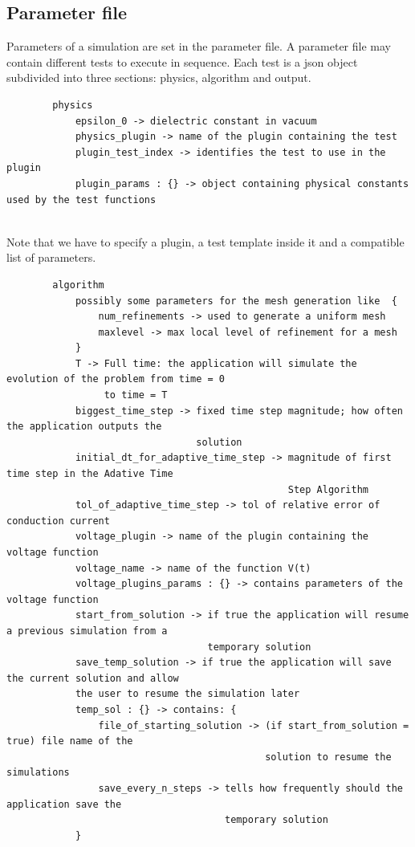 \documentclass[11pt,a4paper]{article}
\begin{document}
\subsection{Parameter file}
Parameters of a simulation are set in the parameter file. A parameter file may contain different tests to execute in sequence. Each test is a json object subdivided into three sections: physics, algorithm and output.\\
\begin{minipage}{\textwidth}
	\vspace{3mm}
	\small
	\begin{verbatim}
		physics
		    epsilon_0 -> dielectric constant in vacuum
		    physics_plugin -> name of the plugin containing the test
		    plugin_test_index -> identifies the test to use in the plugin
		    plugin_params : {} -> object containing physical constants used by the test functions
	\end{verbatim}
	\vspace*{0mm}
\end{minipage}\\
Note that we have to specify a plugin, a test template inside it and a compatible list of parameters.\\
\begin{minipage}{\textwidth}
	\vspace{3mm}
	\small
	\begin{verbatim}
		algorithm
		    possibly some parameters for the mesh generation like  {
		        num_refinements -> used to generate a uniform mesh
			    maxlevel -> max local level of refinement for a mesh
		    }
		    T -> Full time: the application will simulate the evolution of the problem from time = 0
		         to time = T
		    biggest_time_step -> fixed time step magnitude; how often the application outputs the
		                         solution
		    initial_dt_for_adaptive_time_step -> magnitude of first time step in the Adative Time
		                                         Step Algorithm
		    tol_of_adaptive_time_step -> tol of relative error of conduction current
		    voltage_plugin -> name of the plugin containing the voltage function
		    voltage_name -> name of the function V(t)
		    voltage_plugins_params : {} -> contains parameters of the voltage function
		    start_from_solution -> if true the application will resume a previous simulation from a
		                           temporary solution
		    save_temp_solution -> if true the application will save the current solution and allow
		    the user to resume the simulation later
		    temp_sol : {} -> contains: {
		        file_of_starting_solution -> (if start_from_solution = true) file name of the
		                                     solution to resume the simulations
		        save_every_n_steps -> tells how frequently should the application save the
		                              temporary solution
		    }
	\end{verbatim}
\end{minipage}\\
\end{document}

